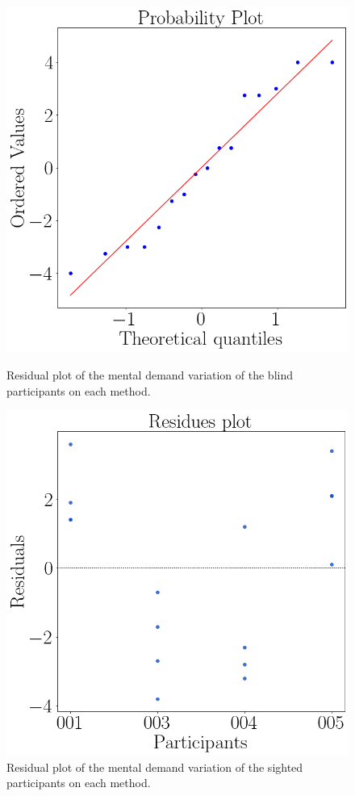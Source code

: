 \begin{figure}[!htb]
    \centering
    \begin{minipage}{0.45\textwidth}
        \centering
        \includegraphics[width = 0.8\linewidth]{Resultados/Nasa/Figuras/png/qqplot_md_var_sight.png}
        \caption{Residual plot of the mental demand variation of the blind participants on each method.}
        \label{fig:qqplot_md_var_sight}
    \end{minipage}
    \begin{minipage}{0.45\textwidth}
        \centering
        \includegraphics[width = 0.8\linewidth]{Resultados/Nasa/Figuras/png/residplot_md_var_sight.png}
        \caption{Residual plot of the mental demand variation of the sighted participants on each method.}
        \label{fig:residplot_md_var_sight}
    \end{minipage}
\end{figure}

